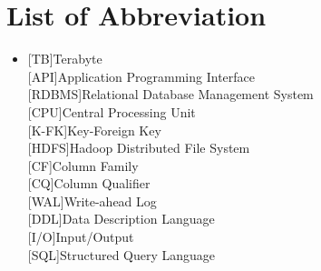 







\chapter{List of Abbreviation}
\label{acronyms}
\begin{itemize}

\item[]
\begin{acronym}[Symbols]
	\acro{}[TB]{Terabyte}\\
	\acro{}[API]{Application Programming Interface}\\
	\acro{}[RDBMS]{Relational Database Management System}\\
	\acro{}[CPU]{Central Processing Unit}\\
	\acro{}[K-FK]{Key-Foreign Key}\\
	\acro{}[HDFS]{Hadoop Distributed File System}\\
	\acro{}[CF]{Column Family}\\
	\acro{}[CQ]{Column Qualifier}\\
	\acro{}[WAL]{Write-ahead Log}\\
	\acro{}[DDL]{Data Description Language}\\
	\acro{}[I/O]{Input/Output}\\
	\acro{}[SQL]{Structured Query Language}\\
	
\end{acronym}
\end{itemize}

    
	


